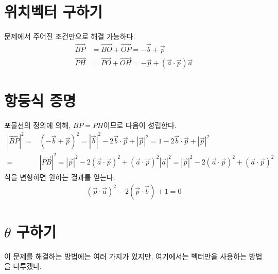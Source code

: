 \documentclass{scrartcl}
\title{\doctitle}
\author{Project Eclipse (손량)}
\date{Last compiled on: \today, \currenttime}
\newcommand{\Seg}[1]{\overline{#1}}
\newcommand{\Ray}[1]{\overrightarrow{#1}}
\begin{document}
\maketitle

\section{위치벡터 구하기}
\begin{figure}[H]
\centering

\end{figure}
문제에서 주어진 조건만으로 해결 가능하다.
\begin{align*}
\Ray{BP}&=\Ray{BO}+\Ray{OP}=-\vec{b}+\vec{p} \\
\Ray{PH}&=\Ray{PO}+\Ray{OH}=-\vec{p}+(\vec{a}\cdot\vec{p})\vec{a}
\end{align*}

\section{항등식 증명}
포물선의 정의에 의해, \(\Seg{BP}=\Seg{PH}\)이므로 다음이 성립한다.
\begin{align*}
|\Ray{BP}|^2=&(-\vec{b}+\vec{p})^2=|\vec{b}|^2-2\vec{b}\cdot\vec{p}+|\vec{p}|^2=1-2\vec{b}\cdot\vec{p}+|\vec{p}|^2 \\
=&|\Ray{PB}|^2=|\vec{p}|^2-2(\vec{a}\cdot\vec{p})^2+(\vec{a}\cdot\vec{p})^2|\vec{a}|^2=|\vec{p}|^2-2(\vec{a}\cdot\vec{p})^2+(\vec{a}\cdot\vec{p})^2
\end{align*}
식을 변형하면 원하는 결과를 얻는다.
\begin{align}\label{identity}(\vec{p}\cdot\vec{a})^2-2(\vec{p}\cdot\vec{b})+1=0\end{align}

\section{\(\theta\) 구하기}
이 문제를 해결하는 방법에는 여러 가지가 있지만, 여기에서는 벡터만을 사용하는 방법을 다루겠다.
\end{document}
